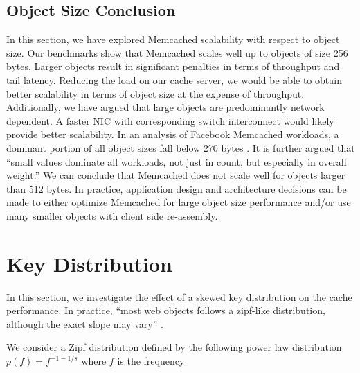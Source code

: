 \subsection{Object Size Conclusion}
In this section, we have explored Memcached scalability with respect to object size. Our benchmarks show that Memcached scales well up to objects of size 256 bytes. Larger objects result in significant penalties in terms of throughput and tail latency. Reducing the load on our cache server, we would be able to obtain better scalability in terms of object size at the expense of throughput. Additionally, we have argued that large objects are predominantly network dependent. A faster NIC with corresponding switch interconnect would likely provide better scalability. In an analysis of Facebook Memcached workloads, a dominant portion of all object sizes fall below 270 bytes \cite{atikoglu2012workload}. It is further argued that ``small values dominate all workloads, not just in count, but especially in overall weight.'' \cite{atikoglu2012workload} We can conclude that Memcached does not scale well for objects larger than 512 bytes. In practice, application design and architecture decisions can be made to either optimize Memcached for large object size performance and/or use many smaller objects with client side re-assembly.


\section{Key Distribution}
In this section, we investigate the effect of a skewed key distribution on the cache performance. In practice, ``most web objects follows a zipf-like distribution, although the exact slope may vary'' \cite{lim2013thin}.

We consider a Zipf distribution defined by the following power law distribution $p(f) = f^{-1-1/s} $ where $f$ is the frequency